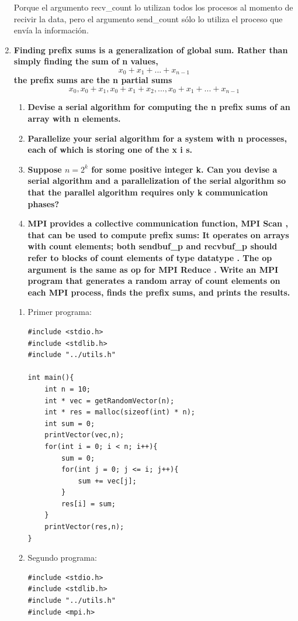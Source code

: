\documentclass[a4paper,12pt]{article}
\begin{document}
\begin{enumerate}
Porque el argumento recv\_count lo utilizan todos los procesos al momento de recivir la data, pero el argumento
send\_count sólo lo utiliza el proceso que envía la información.

\item{\textbf{Finding prefix sums is a generalization of global sum. Rather than simply finding the
sum of n values, }
$$x_{0}+x_{1}+...+x_{n-1}$$
\textbf{the prefix sums are the n partial sums}
$$x_{0},x_{0}+x_{1},x_{0}+x_{1}+x_{2},...,x_{0}+x_{1}+...+x_{n-1}$$
\begin{enumerate}
 \item \textbf{Devise a serial algorithm for computing the n prefix sums of an array with n elements.}
 \item \textbf{Parallelize your serial algorithm for a system with n processes, each of which is storing
 one of the x i s.}
 \item \textbf{Suppose $n = 2^{k}$ for some positive integer k. Can you devise a serial algorithm and a 
 parallelization of the serial algorithm so that the parallel algorithm requires only k communication phases?}
 \item \textbf{MPI provides a collective communication function, MPI Scan , that can be used to compute prefix sums:
 It operates on arrays with count elements; both sendbuf\_p and recvbuf\_p should refer to blocks of count
 elements of type datatype . The op argument is the same as op for MPI Reduce . Write an MPI program that
 generates a random array of count elements on each MPI process, finds the prefix sums, and prints the results.}
\end{enumerate}

}

\begin{enumerate}
 \item Primer programa:
\begin{lstlisting}
#include <stdio.h>
#include <stdlib.h>
#include "../utils.h"

int main(){
	int n = 10;
	int * vec = getRandomVector(n);
	int * res = malloc(sizeof(int) * n);
	int sum = 0;
	printVector(vec,n);
	for(int i = 0; i < n; i++){
		sum = 0;
		for(int j = 0; j <= i; j++){
			sum += vec[j];
		}
		res[i] = sum;
	}
	printVector(res,n);
}
\end{lstlisting}
  \item Segundo programa:
\begin{lstlisting}
#include <stdio.h>
#include <stdlib.h>
#include "../utils.h"
#include <mpi.h>


\end{lstlisting}
\end{enumerate}
\end{enumerate}
\end{document}
